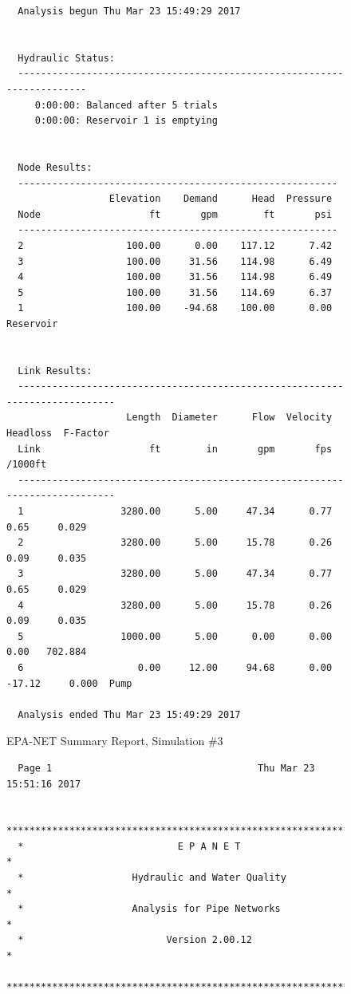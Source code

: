 \documentclass[11pt]{article}
\begin{document}
\begin{enumerate}
\begin{figure}[ht!]
\begin{verbatim}
  Analysis begun Thu Mar 23 15:49:29 2017

   
  Hydraulic Status:
  -----------------------------------------------------------------------
     0:00:00: Balanced after 5 trials
     0:00:00: Reservoir 1 is emptying
   
   
  Node Results:
  --------------------------------------------------------
                  Elevation    Demand      Head  Pressure
  Node                   ft       gpm        ft       psi
  --------------------------------------------------------
  2                  100.00      0.00    117.12      7.42
  3                  100.00     31.56    114.98      6.49
  4                  100.00     31.56    114.98      6.49
  5                  100.00     31.56    114.69      6.37
  1                  100.00    -94.68    100.00      0.00  Reservoir
   
   
  Link Results:
  ----------------------------------------------------------------------------
                     Length  Diameter      Flow  Velocity  Headloss  F-Factor
  Link                   ft        in       gpm       fps   /1000ft          
  ----------------------------------------------------------------------------
  1                 3280.00      5.00     47.34      0.77      0.65     0.029
  2                 3280.00      5.00     15.78      0.26      0.09     0.035
  3                 3280.00      5.00     47.34      0.77      0.65     0.029
  4                 3280.00      5.00     15.78      0.26      0.09     0.035
  5                 1000.00      5.00      0.00      0.00      0.00   702.884
  6                    0.00     12.00     94.68      0.00    -17.12     0.000  Pump
   
  Analysis ended Thu Mar 23 15:49:29 2017

  \end{verbatim}
     \caption{EPA-NET Summary Report, Simulation \#3}
   \label{fig:epanet3} 
\end{figure}
\begin{figure}[ht!] %
\centering
\begin{verbatim}
  Page 1                                    Thu Mar 23 15:51:16 2017

  ******************************************************************
  *                           E P A N E T                          *
  *                   Hydraulic and Water Quality                  *
  *                   Analysis for Pipe Networks                   *
  *                         Version 2.00.12                        *
  ******************************************************************
  

\end{verbatim}
\end{figure}
\end{enumerate}
\end{document}
